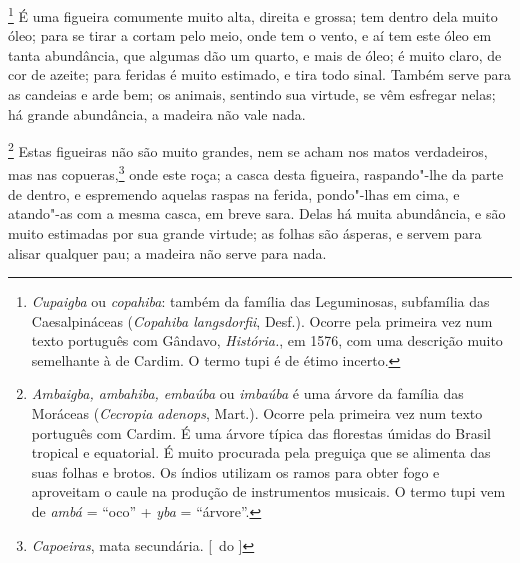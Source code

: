 \begin{linenumbers}
\footnote{ \textit{Cupaigba} ou \textit{copahiba}: 
também da família das Leguminosas, subfamília das Caesalpináceas
(\textit{Copahiba langsdorfii}, Desf.). Ocorre pela primeira vez num
texto português com Gândavo, \textit{História.}, em 1576, com uma
descrição muito semelhante à de Cardim. O termo tupi é de étimo
incerto.} É uma figueira comumente muito alta, direita e
grossa; tem dentro dela muito óleo; para se tirar a cortam pelo meio,
onde tem o vento, e aí tem este óleo em tanta abundância, que algumas
dão um quarto, e mais de óleo; é muito claro, de cor de azeite; para
feridas é muito estimado, e tira todo sinal. Também serve para as
candeias e arde bem; os animais, sentindo sua virtude, se vêm esfregar
nelas; há grande abundância, a madeira não vale nada.

\footnote{ \textit{Ambaigba, ambahiba, embaúba} ou
 \textit{imbaúba} é uma árvore da família das Moráceas
(\textit{Cecropia adenops}, Mart.). Ocorre pela primeira vez num texto
português com Cardim. É uma árvore típica das florestas úmidas do
Brasil tropical e equatorial. É muito procurada pela preguiça que se
alimenta das suas folhas e brotos. Os índios utilizam os ramos para
obter fogo e aproveitam o caule na produção de instrumentos musicais. O
termo tupi vem de \textit{ambá} = ``oco'' + \textit{yba} = ``árvore''.} 
Estas figueiras não são muito grandes, nem se
acham nos matos verdadeiros, mas nas copueras,\footnote{ \textit{Capoeiras}, mata secundária. [~do ]} onde este roça; a casca 
desta figueira, raspando"-lhe da parte de dentro, e espremendo aquelas
raspas na ferida, pondo"-lhas em cima, e atando"-as com a mesma casca,
em breve sara. Delas há muita abundância, e são muito estimadas por sua
grande virtude; as folhas são ásperas, e servem para alisar qualquer
pau; a madeira não serve para nada.


\end{linenumbers}
